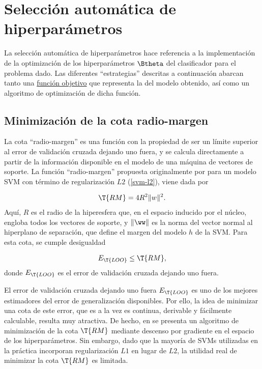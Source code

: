 \section{Selección automática de hiperparámetros}
La selección automática de hiperparámetros hace referencia a la
implementación de la optimización de los hiperparámetros $\Btheta$ del
clasificador para el problema dado.  Las diferentes ``estrategias''
descritas a continuación abarcan tanto una
\hyperref[funcobjetivo]{función objetivo} que representa la
 del modelo obtenido, así como un algoritmo de optimización
de dicha función.

\subsection{Minimización de la cota radio-margen}
La cota ``radio-margen'' es una función con la propiedad de ser un
límite superior al error de validación cruzada dejando uno fuera, y se
calcula directamente a partir de la información disponible en el
modelo de una máquina de vectores de soporte.  La función
``radio-margen'' propuesta originalmente por \citeauthor{vapnik}
\cite{vapnik} para un modelo SVM  con término de regularización $L2$
(\autoref{svm-l2}), viene dada por %

\begin{align}
  \T{RM} = 4R^2 \|w\|^2.
\end{align}
Aquí, $R$ es el radio de la hiperesfera que, en el espacio inducido
por el núcleo, engloba todos los vectores de soporte, y $\|\ww\|$ es
la norma del vector normal al hiperplano de separación, que define el
margen del modelo $h$ de la SVM.  Para esta cota, se cumple
desigualdad

\begin{align}
  E_{\T{LOO}} \leq \T{RM},
\end{align}
donde $E_{\T{LOO}}$ es el error de validación cruzada dejando uno
fuera.

El error de validación cruzada dejando uno fuera $E_{\T{LOO}}$ es uno
de los mejores estimadores del error de generalización disponibles.
Por ello, la idea de minimizar una cota de este error, que es a la vez
es continua, derivable y fácilmente calculable, resulta muy atractiva.
De hecho, en \cite{chapelle} se presenta un algoritmo de minimización
de la cota $\T{RM}$ mediante descenso por gradiente en el espacio de
los hiperparámetros.  Sin embargo, dado que la mayoría de SVMs
utilizadas en la práctica incorporan regularización $L1$ en lugar de
$L2$, la utilidad real de minimizar la cota $\T{RM}$ es limitada.


